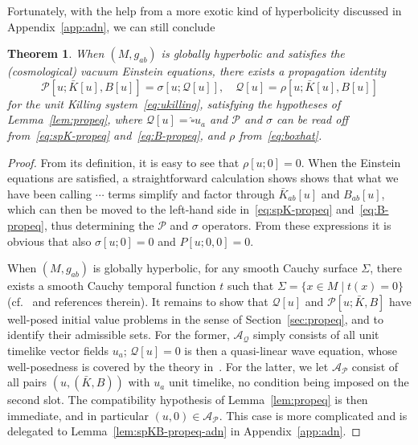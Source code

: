 \documentclass[a4paper]{article}
\newtheorem{thm}{Theorem}
\theoremstyle{remark}
\begin{document}
Fortunately, with the help from a more exotic kind of hyperbolicity
discussed in Appendix~\ref{app:adn}, we can still conclude
\begin{thm} \label{thm:ukilling-propeq}
When $(M,g_{ab})$ is globally hyperbolic and satisfies the
(cosmological) vacuum Einstein equations, there exists a propagation
identity
\begin{equation}
	\mathcal{P}[u; \bar{K}[u], B[u]] = \sigma[u; \mathcal{Q}[u]] ,
	\quad
	\mathcal{Q}[u] = \rho[u; \bar{K}[u], B[u]]
\end{equation}
for the unit Killing system~\eqref{eq:ukilling}, satisfying the
hypotheses of Lemma~\ref{lem:propeq}, where $\mathcal{Q}[u] =
\hat{\square} u_a$ and $\mathcal{P}$ and $\sigma$ can be read off
from~\eqref{eq:spK-propeq} and~\eqref{eq:B-propeq}, and $\rho$
from~\eqref{eq:boxhat}.
\end{thm}
\begin{proof}
From its definition, it is easy to see that $\rho[u;0] = 0$. When the
Einstein equations are satisfied, a straightforward calculation shows
shows that what we have been calling $\cdots$ terms simplify and factor
through $\bar{K}_{ab}[u]$ and $B_{ab}[u]$, which can then be moved to
the left-hand side in~\eqref{eq:spK-propeq} and~\eqref{eq:B-propeq},
thus determining the $\mathcal{P}$ and $\sigma$ operators. From these
expressions it is obvious that also $\sigma[u;0] = 0$ and $P[u;0,0] =
0$.

When $(M,g_{ab})$ is globally hyperbolic, for any smooth Cauchy surface
$\Sigma$, there exists a smooth Cauchy temporal function $t$ such that
$\Sigma = \{ x \in M \mid t(x) = 0 \}$ (cf.~\cite[Thm.1]{bernard-suhr}
and references therein). It remains to show that $\mathcal{Q}[u]$ and
$\mathcal{P}[u;\bar{K},B]$ have well-posed initial value problems in the
sense of Section~\ref{sec:propeq}, and to identify their admissible
sets. For the former, $\mathcal{A}_\mathcal{Q}$ simply consists of all
unit timelike vector fields $u_a$; $\mathcal{Q}[u] = 0$ is then a
quasi-linear wave equation, whose well-posedness is covered by the
theory in~\cite[Ch.9]{ringstrom-cauchy}. For the latter, we let
$\mathcal{A}_\mathcal{P}$ consist of all pairs $(u, (\bar{K},B))$ with
$u_a$ unit timelike, no condition being imposed on the second slot. The
compatibility hypothesis of Lemma~\ref{lem:propeq} is then immediate,
and in particular $(u,0) \in \mathcal{A}_\mathcal{P}$. This case is more
complicated and is delegated to Lemma~\ref{lem:spKB-propeq-adn} in
Appendix~\ref{app:adn}.
\end{proof}
\end{document}
